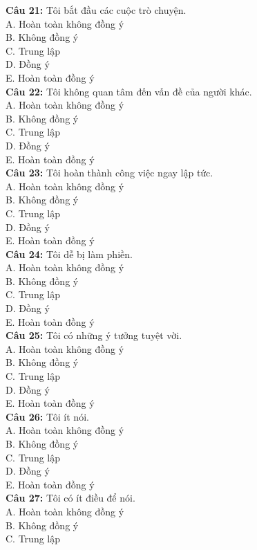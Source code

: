 \begin{multicols}{2}
\textbf{Câu 21:} Tôi bắt đầu các cuộc trò chuyện. \\
A. Hoàn toàn không đồng ý \\
B. Không đồng ý \\
C. Trung lập \\
D. Đồng ý \\
E. Hoàn toàn đồng ý \\
\textbf{Câu 22:} Tôi không quan tâm đến vấn đề của người khác. \\
A. Hoàn toàn không đồng ý \\
B. Không đồng ý \\
C. Trung lập \\
D. Đồng ý \\
E. Hoàn toàn đồng ý \\
\textbf{Câu 23:} Tôi hoàn thành công việc ngay lập tức. \\
A. Hoàn toàn không đồng ý \\
B. Không đồng ý \\
C. Trung lập \\
D. Đồng ý \\
E. Hoàn toàn đồng ý \\
\textbf{Câu 24:} Tôi dễ bị làm phiền. \\
A. Hoàn toàn không đồng ý \\
B. Không đồng ý \\
C. Trung lập \\
D. Đồng ý \\
E. Hoàn toàn đồng ý \\
\textbf{Câu 25:} Tôi có những ý tưởng tuyệt vời. \\
A. Hoàn toàn không đồng ý \\
B. Không đồng ý \\
C. Trung lập \\
D. Đồng ý \\
E. Hoàn toàn đồng ý \\
\textbf{Câu 26:} Tôi ít nói. \\
A. Hoàn toàn không đồng ý \\
B. Không đồng ý \\
C. Trung lập \\
D. Đồng ý \\
E. Hoàn toàn đồng ý \\
\textbf{Câu 27:} Tôi có ít điều để nói. \\
A. Hoàn toàn không đồng ý \\
B. Không đồng ý \\
C. Trung lập \\

\end{multicols}
